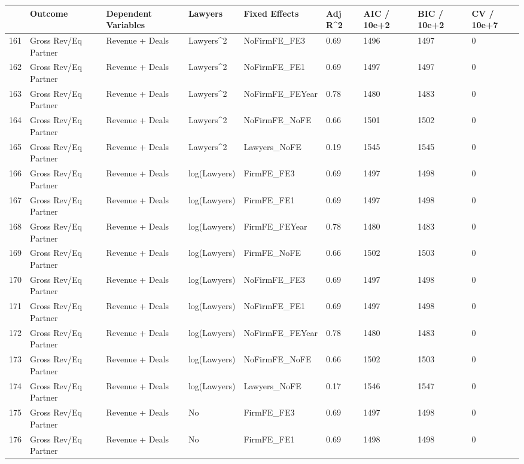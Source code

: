 \documentclass{article}
\begin{document}
\begin{table}[H]
\centering
\begin{tabular}{rllllllll}
  \hline
 & Outcome & Dependent Variables & Lawyers & Fixed Effects & Adj R^2 & AIC / 10e+2 & BIC / 10e+2 & CV / 10e+7 \\ 
  \hline
161 & Gross Rev/Eq Partner & Revenue + Deals & Lawyers^2 & NoFirmFE\_FE3 & 0.69 & 1496 & 1497 & 0 \\ 
  162 & Gross Rev/Eq Partner & Revenue + Deals & Lawyers^2 & NoFirmFE\_FE1 & 0.69 & 1497 & 1497 & 0 \\ 
  163 & Gross Rev/Eq Partner & Revenue + Deals & Lawyers^2 & NoFirmFE\_FEYear & 0.78 & 1480 & 1483 & 0 \\ 
  164 & Gross Rev/Eq Partner & Revenue + Deals & Lawyers^2 & NoFirmFE\_NoFE & 0.66 & 1501 & 1502 & 0 \\ 
  165 & Gross Rev/Eq Partner & Revenue + Deals & Lawyers^2 & Lawyers\_NoFE & 0.19 & 1545 & 1545 & 0 \\ 
  166 & Gross Rev/Eq Partner & Revenue + Deals & log(Lawyers) & FirmFE\_FE3 & 0.69 & 1497 & 1498 & 0 \\ 
  167 & Gross Rev/Eq Partner & Revenue + Deals & log(Lawyers) & FirmFE\_FE1 & 0.69 & 1497 & 1498 & 0 \\ 
  168 & Gross Rev/Eq Partner & Revenue + Deals & log(Lawyers) & FirmFE\_FEYear & 0.78 & 1480 & 1483 & 0 \\ 
  169 & Gross Rev/Eq Partner & Revenue + Deals & log(Lawyers) & FirmFE\_NoFE & 0.66 & 1502 & 1503 & 0 \\ 
  170 & Gross Rev/Eq Partner & Revenue + Deals & log(Lawyers) & NoFirmFE\_FE3 & 0.69 & 1497 & 1498 & 0 \\ 
  171 & Gross Rev/Eq Partner & Revenue + Deals & log(Lawyers) & NoFirmFE\_FE1 & 0.69 & 1497 & 1498 & 0 \\ 
  172 & Gross Rev/Eq Partner & Revenue + Deals & log(Lawyers) & NoFirmFE\_FEYear & 0.78 & 1480 & 1483 & 0 \\ 
  173 & Gross Rev/Eq Partner & Revenue + Deals & log(Lawyers) & NoFirmFE\_NoFE & 0.66 & 1502 & 1503 & 0 \\ 
  174 & Gross Rev/Eq Partner & Revenue + Deals & log(Lawyers) & Lawyers\_NoFE & 0.17 & 1546 & 1547 & 0 \\ 
  175 & Gross Rev/Eq Partner & Revenue + Deals & No & FirmFE\_FE3 & 0.69 & 1497 & 1498 & 0 \\ 
  176 & Gross Rev/Eq Partner & Revenue + Deals & No & FirmFE\_FE1 & 0.69 & 1498 & 1498 & 0 \\ 

\end{tabular}
\end{table}
\end{document}
